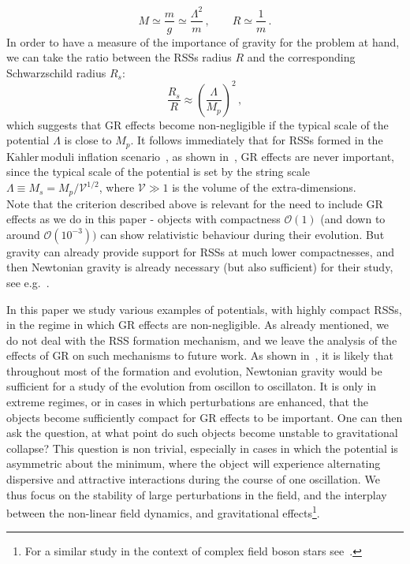 \documentclass[11pt,a4paper]{article}
\newcommand{\Kahler}{\ensuremath{\text{K}\ddot{\text{a}}\text{hler}\,}}
\begin{document}
\begin{equation}
M \simeq \frac{m}{g} \simeq \frac{\Lambda^2}{m} \,, \qquad R \simeq \frac{1}{m} \,.
\end{equation}
In order to have a measure of the importance of gravity for the problem at hand, we can take the ratio between the RSSs radius $R$ and the corresponding Schwarzschild radius $R_s$:
\begin{equation}
\frac{R_s}{R} \approx \left(\frac{\Lambda}{M_p}\right)^2 \,,
\end{equation}
which suggests that GR effects become non-negligible if the typical scale of the potential $\Lambda$ is close to $M_p$. It follows immediately that for RSSs formed in the \Kahler moduli inflation scenario~\cite{Conlon:2005jm}, as shown in~\cite{Antusch:2017flz}, GR effects are never important, since the typical scale of the potential is set by the string scale $\Lambda \equiv M_s = M_p/\mathcal{V}^{1/2}$, where $\mathcal{V} \gg 1$ is the volume of the extra-dimensions.\\
Note that the criterion described above is relevant for the need to include GR effects as we do in this paper - objects with compactness $\mathcal{O}(1)$ (and down to around $\mathcal{O}(10^{-3}))$ can show relativistic behaviour during their evolution. But gravity can already provide support for RSSs at much lower compactnesses, and then Newtonian gravity is already necessary (but also sufficient) for their study, see e.g.~\cite{Visinelli:2017ooc, Schiappacasse:2017ham}.

In this paper we study various examples of potentials, with highly compact RSSs, in the regime in which GR effects are non-negligible. As already mentioned, we do not deal with the RSS formation mechanism, and we leave the analysis of the effects of GR on such mechanisms to future work. As shown in~\cite{Amin:2019ums}, it is likely that throughout most of the formation and evolution, Newtonian gravity would be sufficient for a study of the evolution from oscillon to oscillaton. It is only in extreme regimes, or in cases in which perturbations are enhanced, that the objects become sufficiently compact for GR effects to be important. One can then ask the question, at what point do such objects become unstable to gravitational collapse? This question is non trivial, especially in cases in which the potential is asymmetric about the minimum, where the object will experience alternating dispersive and attractive interactions during the course of one oscillation. We thus focus on the stability of large perturbations in the field, and the interplay between the non-linear field dynamics, and gravitational effects\footnote{For a similar study in the context of complex field boson stars see~\cite{Cunha:2017wao}.}. 
\end{document}
